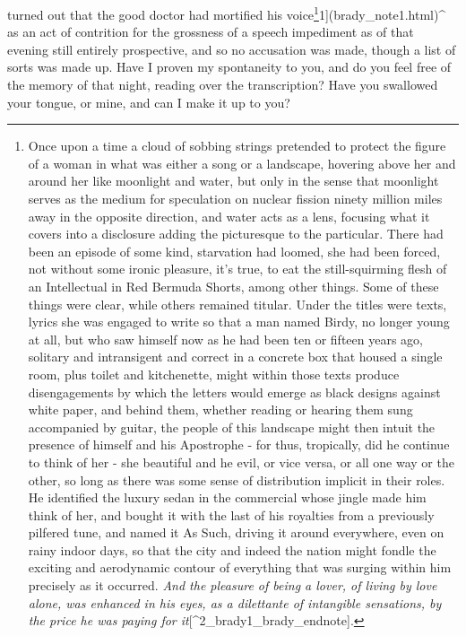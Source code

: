 \documentclass[
]{memoir}
\begin{document}
turned out that the good doctor had mortified his voice\footnote{Once
  upon a time a cloud of sobbing strings pretended to protect the figure
  of a woman in what was either a song or a landscape, hovering above
  her and around her like moonlight and water, but only in the sense
  that moonlight serves as the medium for speculation on nuclear fission
  ninety million miles away in the opposite direction, and water acts as
  a lens, focusing what it covers into a disclosure adding the
  picturesque to the particular. There had been an episode of some kind,
  starvation had loomed, she had been forced, not without some ironic
  pleasure, it's true, to eat the still-squirming flesh of an
  Intellectual in Red Bermuda Shorts, among other things. Some of these
  things were clear, while others remained titular. Under the titles
  were texts, lyrics she was engaged to write so that a man named Birdy,
  no longer young at all, but who saw himself now as he had been ten or
  fifteen years ago, solitary and intransigent and correct in a concrete
  box that housed a single room, plus toilet and kitchenette, might
  within those texts produce disengagements by which the letters would
  emerge as black designs against white paper, and behind them, whether
  reading or hearing them sung accompanied by guitar, the people of this
  landscape might then intuit the presence of himself and his Apostrophe
  - for thus, tropically, did he continue to think of her - she
  beautiful and he evil, or vice versa, or all one way or the other, so
  long as there was some sense of distribution implicit in their roles.
  He identified the luxury sedan in the commercial whose jingle made him
  think of her, and bought it with the last of his royalties from a
  previously pilfered tune, and named it As Such, driving it around
  everywhere, even on rainy indoor days, so that the city and indeed the
  nation might fondle the exciting and aerodynamic contour of everything
  that was surging within him precisely as it occurred. \emph{And the
  pleasure of being a lover, of living by love alone, was enhanced in
  his eyes, as a dilettante of intangible sensations, by the price he
  was paying for it}{[}\^{}2\_brady1\_brady\_endnote{]}.}1{]}(brady\_note1.html)\^{}
as an act of contrition for the grossness of a speech impediment as of
that evening still entirely prospective, and so no accusation was made,
though a list of sorts was made up. Have I proven my spontaneity to you,
and do you feel free of the memory of that night, reading over the
transcription? Have you swallowed your tongue, or mine, and can I make
it up to you?
\end{document}
